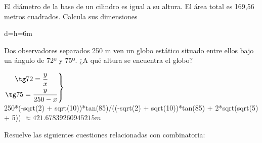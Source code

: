 \documentclass[addpoints,spanish, 12pt,a4paper]{exam}
\begin{document}
\begin{questions}
\begin{parts}
\end{parts}

\question[2] El  diámetro  de  la  base  de  un  cilindro  es  igual  a  su  altura.  El  área  total  es  169,56 metros cuadrados. Calcula sus dimensiones
\begin{solution}
d=h=6m
\end{solution}

\question[2]   Dos observadores separados 250 m ven un globo estático situado entre ellos bajo un ángulo de 72º y
75º. ¿A qué altura se encuentra el globo?
\begin{solution} $\left. \begin{gathered}
	  \tg 72 = \frac{y}{x} \\
	  \tg 75 = \frac{y}{250-x} \hfill
	 \end{gathered}  \right\rbrace$\\
250*(-sqrt(2) + sqrt(10))*tan(85)/((-sqrt(2) + sqrt(10))*tan(85) + 2*sqrt(sqrt(5) + 5))	 
	  $\approx421.67839260945215 m $ \end{solution}

\question Resuelve las siguientes cuestiones relacionadas con combinatoria:
\end{questions}
\end{document}
